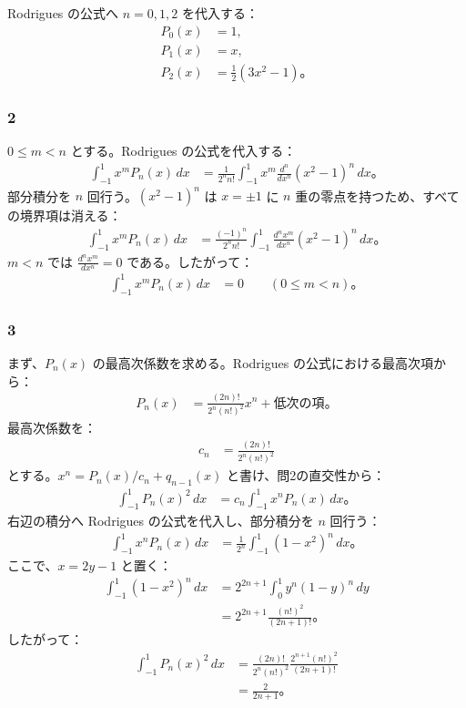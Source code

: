 \documentclass[platex,dvipdfmx,a4paper]{jsarticle}
\newcommand{\nbbn}[3]{\frac{d^{#1} #2}{d #3^{#1}}}
\begin{document}
Rodrigues の公式へ $n=0,1,2$ を代入する：
\begin{align*}
  P_0(x)&=1,\\
  P_1(x)&=x,\\
  P_2(x)&=\frac{1}{2}(3x^2-1)。
\end{align*}

\subsubsection*{2}

$0\leq m<n$ とする。Rodrigues の公式を代入する：
\begin{align*}
  \int_{-1}^{1}x^mP_n(x)\,dx
  &=\frac{1}{2^nn!}\int_{-1}^{1}x^m\nbbn{n}{}{x}(x^2-1)^n\,dx。
\end{align*}
部分積分を $n$ 回行う。$(x^2-1)^n$ は $x=\pm1$ に $n$ 重の零点を持つため、すべての境界項は消える：
\begin{align*}
  \int_{-1}^{1}x^mP_n(x)\,dx
  &=\frac{(-1)^n}{2^nn!}\int_{-1}^{1}\nbbn{n}{x^m}{x}(x^2-1)^n\,dx。
\end{align*}
$m<n$ では $\nbbn{n}{x^m}{x}=0$ である。したがって：
\begin{align*}
  \int_{-1}^{1}x^mP_n(x)\,dx
  &=0
  \qquad (0\leq m<n)。
\end{align*}

\subsubsection*{3}

まず、$P_n(x)$ の最高次係数を求める。Rodrigues の公式における最高次項から：
\begin{align*}
  P_n(x)
  &=\frac{(2n)!}{2^n(n!)^2}x^n+\text{低次の項}。
\end{align*}
最高次係数を：
\begin{align*}
  c_n&=\frac{(2n)!}{2^n(n!)^2}
\end{align*}
とする。$x^n=P_n(x)/c_n+q_{n-1}(x)$ と書け、問2の直交性から：
\begin{align*}
  \int_{-1}^{1}P_n(x)^2\,dx
  &=c_n\int_{-1}^{1}x^nP_n(x)\,dx。
\end{align*}
右辺の積分へ Rodrigues の公式を代入し、部分積分を $n$ 回行う：
\begin{align*}
  \int_{-1}^{1}x^nP_n(x)\,dx
  &=\frac{1}{2^n}\int_{-1}^{1}(1-x^2)^n\,dx。
\end{align*}
ここで、$x=2y-1$ と置く：
\begin{align*}
  \int_{-1}^{1}(1-x^2)^n\,dx
  &=2^{2n+1}\int_0^1y^n(1-y)^n\,dy \\
  &=2^{2n+1}\frac{(n!)^2}{(2n+1)!}。
\end{align*}
したがって：
\begin{align*}
  \int_{-1}^{1}P_n(x)^2\,dx
  &=\frac{(2n)!}{2^n(n!)^2}
    \frac{2^{n+1}(n!)^2}{(2n+1)!} \\
  &=\frac{2}{2n+1}。
\end{align*}
\end{document}
